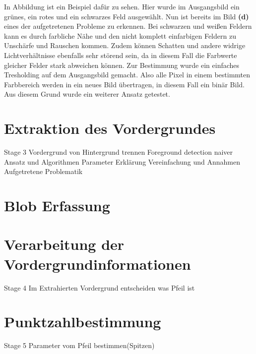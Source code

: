 In Abbildung  ist ein Beispiel dafür zu sehen. Hier wurde im Ausgangsbild ein grünes, ein rotes und ein schwarzes Feld ausgewählt. Nun ist bereits im Bild \textbf{(d)} eines der aufgetretenen Probleme zu erkennen. Bei schwarzen und weißen Feldern kann es durch farbliche Nähe und den nicht komplett einfarbigen Feldern zu Unschärfe und Rauschen kommen. Zudem können Schatten und andere widrige Lichtverhältnisse ebenfalls sehr störend sein, da in diesem Fall die Farbwerte gleicher Felder stark abweichen können. 
Zur Bestimmung wurde ein einfaches Tresholding auf dem Ausgangsbild gemacht. Also alle Pixel in einem bestimmten Farbbereich werden in ein neues Bild übertragen, in diesem Fall ein binär Bild.
Aus diesem Grund wurde ein weiterer Ansatz getestet.


\section{Extraktion des Vordergrundes}
\label{sec:substraction}
Stage 3 Vordergrund von Hintergrund trennen
Foreground detection naiver Ansatz und Algorithmen
Parameter Erklärung
Vereinfachung und Annahmen
Aufgetretene Problematik

\section{Blob Erfassung}
\label{sec:blob}


\section{Verarbeitung der Vordergrundinformationen}
\label{sec:foreground}
Stage 4 Im Extrahierten Vordergrund entscheiden was Pfeil ist
\section{Punktzahlbestimmung}
\label{sec:score}
Stage 5 Parameter vom Pfeil bestimmen(Spitzen)
